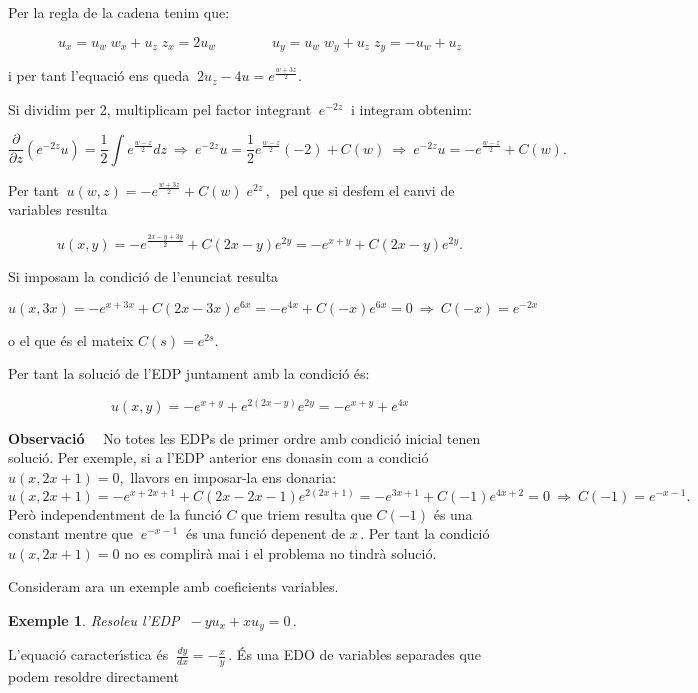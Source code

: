 \documentclass[12pt]{article}
\newcommand{\observacio}{\textbf{Observaci{\'o}}\ \ }
\newtheorem{exemple}{Exemple}[subsection]
\begin{document}
Per la regla de la cadena tenim que:

$$
u_x=u_w\; w_x+u_z\; z_x=2u_w\qquad\qquad u_y=u_w\;w_y+u_z\;z_y=-u_w+u_z
$$

i per tant l'equaci{\'o} ens queda $\ 2u_z-4u=e^{\frac{w+3z}{2}}.$

Si dividim per 2,  multiplicam pel factor integrant $\ e^{-2z}\ $ i integram obtenim:

\[
 \frac{\partial}{\partial z}\left(e^{-2z}u\right)=\frac{1}{2}\int e^{\frac{w-z}{2}}dz\ \Rightarrow \ e^{-2z}u=\frac{1}{2}e^{\frac{w-z}{2}}(-2)+C(w)\ \Rightarrow \ e^{-2z}u=-e^\frac{w-z}{2}+C(w).
\]

Per tant $\ u(w,z)=-e^{\frac{w+3z}{2}}+C(w)\;e^{2z}\,,\ $ pel que si desfem el canvi de variables resulta

\[
 u(x,y)=-e^\frac{2x-y+3y}{2}+C(2x-y)e^{2y}=-e^{x+y}+C(2x-y)e^{2y}.
\]

Si imposam la condici{\'o} de l'enunciat resulta

\[
 u(x,3x)=-e^{x+3x}+C(2x-3x)e^{6x}=-e^{4x}+C(-x)e^{6x}=0\ \Rightarrow \ C(-x)=e^{-2x}
\]

o el que {\'e}s el mateix $C(s)=e^{2s}.$

Per tant la soluci{\'o} de l'EDP juntament amb la condici{\'o} {\'e}s:

\[
 u(x,y)=-e^{x+y}+e^{2(2x-y)}e^{2y}=-e^{x+y}+e^{4x}
\]


\vspace{0.4cm}
\observacio
No totes les EDPs de primer ordre amb condici{\'o}  inicial tenen soluci{\'o}. Per exemple, si a l'EDP anterior
ens donasin com a condici{\'o} $u(x,2x+1)=0, $ llavors en imposar-la ens donaria:
\[
 u(x,2x+1)=-e^{x+2x+1}+C(2x-2x-1)e^{2(2x+1)}=-e^{3x+1}+C(-1)e^{4x+2}=0 \ \Rightarrow \ C(-1)=e^{-x-1}.
\]
Per{\`o} independentment de la funci{\'o} $C$ que triem resulta que $C(-1)$ {\'e}s una constant mentre que $\ e^{-x-1}\ $
{\'e}s una funci{\'o} depenent de $x\,.$ Per tant la condici{\'o} $u(x,2x+1)=0$ no es complir{\`a} mai i el problema no tindr{\`a} soluci{\'o}.


\vspace{0.8cm}
Consideram ara un exemple amb coeficients variables.

\vspace{0.4cm}
\begin{exemple}
Resoleu l'EDP $\ -yu_x+xu_y=0\,.$
\end{exemple}

L'equaci{\'o} caracter{\'\i}stica {\'e}s $\ \frac{dy}{dx}=-\frac{x}{y}\,.$ {\'E}s una EDO de variables separades que podem
resoldre directament
\end{document}
